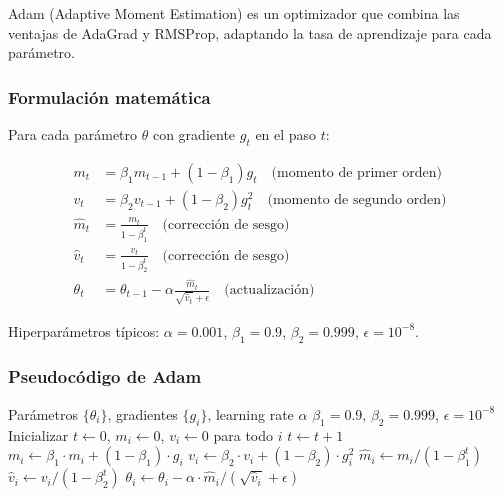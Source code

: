 \documentclass[a4paper,11pt]{article}
\begin{document}
Adam (Adaptive Moment Estimation) es un optimizador que combina las ventajas de AdaGrad y RMSProp, adaptando la tasa de aprendizaje para cada parámetro.

\subsubsection{Formulación matemática}

Para cada parámetro $\theta$ con gradiente $g_t$ en el paso $t$:

\begin{align}
m_t &= \beta_1 m_{t-1} + (1 - \beta_1) g_t \quad \text{(momento de primer orden)} \\
v_t &= \beta_2 v_{t-1} + (1 - \beta_2) g_t^2 \quad \text{(momento de segundo orden)} \\
\hat{m}_t &= \frac{m_t}{1 - \beta_1^t} \quad \text{(corrección de sesgo)} \\
\hat{v}_t &= \frac{v_t}{1 - \beta_2^t} \quad \text{(corrección de sesgo)} \\
\theta_t &= \theta_{t-1} - \alpha \frac{\hat{m}_t}{\sqrt{\hat{v}_t} + \epsilon} \quad \text{(actualización)}
\end{align}

Hiperparámetros típicos: $\alpha = 0.001$, $\beta_1 = 0.9$, $\beta_2 = 0.999$, $\epsilon = 10^{-8}$.

\subsubsection{Pseudocódigo de Adam}

\begin{algorithm}[H]
\caption{Optimizador Adam}
\begin{algorithmic}[1]
\Require Parámetros $\{\theta_i\}$, gradientes $\{g_i\}$, learning rate $\alpha$
\Require $\beta_1 = 0.9$, $\beta_2 = 0.999$, $\epsilon = 10^{-8}$
\State Inicializar $t \gets 0$, $m_i \gets 0$, $v_i \gets 0$ para todo $i$
    \State $t \gets t + 1$
        \State $m_i \gets \beta_1 \cdot m_i + (1 - \beta_1) \cdot g_i$
        \State $v_i \gets \beta_2 \cdot v_i + (1 - \beta_2) \cdot g_i^2$
        \State $\hat{m}_i \gets m_i / (1 - \beta_1^t)$
        \State $\hat{v}_i \gets v_i / (1 - \beta_2^t)$
        \State $\theta_i \gets \theta_i - \alpha \cdot \hat{m}_i / (\sqrt{\hat{v}_i} + \epsilon)$
    \EndFor
\EndProcedure
\end{algorithmic}
\end{algorithm}
\end{document}
